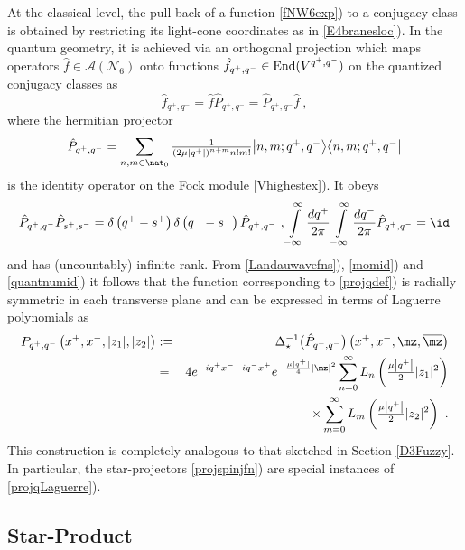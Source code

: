 At the classical level, the pull-back of a function \eqref{fNW6exp}) to
a conjugacy class is obtained by restricting its light-cone
coordinates as in \eqref{E4branesloc}). In the quantum geometry, it is
achieved via an orthogonal projection which maps operators $\hat
f\in\mathcal{A}(\mathcal{N}_6)$ onto functions $\hat f_{q^+,q^-}\in{\rm
  End}(V^{q^+,q^-})$ on the quantized conjugacy classes as
\begin{equation}
\hat f_{q^+,q^-}=\hat f \hat P_{q^+,q^-}=\hat P_{q^+,q^-} \hat f \ ,
\label{orthoprojfns}\end{equation}
where the hermitian projector
\begin{equation}
\hat P_{q^+,q^-}=\sum_{n,m\in\nat_0}\mbox{$\frac1{\left(2\mu \left|q^+
\right|\right)^{n+m} n! m!}$} \bigl|n,m;q^+,q^-\bigr\rangle
\bigl\langle n,m;q^+,q^-\bigr|
\label{projqdef}\end{equation}
is the identity operator on the Fock module \eqref{Vhighestex}). It
obeys
\begin{equation}
\hat P_{q^+,q^-} \hat P_{s^+,s^-}=\delta\left(q^+-s^+\right) 
\delta\left(q^--s^-\right) \hat P_{q^+,q^-}\ ,   
\int\limits_{-\infty}^\infty\frac{ d q^+}{2\pi} 
\int\limits_{-\infty}^\infty\frac{ d q^-}{2\pi} \hat P_{q^+,q^-}
=\id
\label{projqprops}\end{equation}
and has (uncountably) infinite rank. From \eqref{Landauwavefns}),
\eqref{momid}) and \eqref{quantnumid}) it follows that the function
corresponding to \eqref{projqdef}) is radially symmetric in each
transverse plane and can be expressed in terms of Laguerre polynomials
as
\begin{eqnarray}
P_{q^+,q^-}\left(x^+,x^-,|z_1|,|z_2|\right)&:=&\Delta_\star^{-1}\bigl(
\hat P_{q^+,q^-}\bigr)\left(x^+,x^-,\mz,\overline{\mz} \right)
\nonumber\\ &=&4  e^{- i q^+x^-- i q^-x^+}  e^{-\frac{\mu |q^+|}4 
|\mz|^2} \sum_{n=0}^\infty L_n\left(\mbox{$\frac{\mu \left|q^+\right|}2$}
|z_1|^2\right)\nonumber\\ &&\times 
\sum_{m=0}^\infty L_m\left(\mbox{$\frac{\mu \left|q^+\right|}2$}
|z_2|^2\right) \ .
\label{projqLaguerre}\end{eqnarray}
This construction is completely analogous to that sketched in
Section \ref{D3Fuzzy}. In particular, the star-projectors
\eqref{projspinjfn}) are special instances of \eqref{projqLaguerre}).

\subsection{Star-Product\label{NW6Star}}

